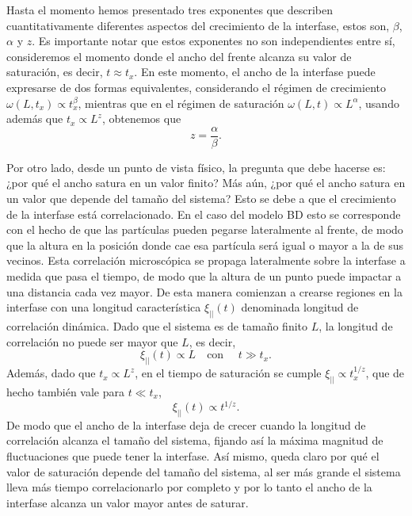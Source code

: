Hasta el momento hemos presentado tres exponentes que describen cuantitativamente diferentes aspectos del crecimiento de la interfase, estos son, 
$\beta$, $\alpha$ y $z$. Es importante notar que estos exponentes no son independientes entre sí, consideremos el momento donde el ancho del frente
alcanza su valor de saturación, es decir, $t \approx t_x$. En este momento, el ancho de la interfase puede expresarse de dos formas equivalentes, 
considerando el régimen de crecimiento $\omega(L,t_x) \propto t_x^\beta$, mientras que en el régimen de saturación $\omega(L,t) \propto L^\alpha$, usando además
que $t_x \propto L^z$, obtenemos que 
\begin{equation}
    z = \frac{\alpha}{\beta}.
\end{equation}

Por otro lado, desde un punto de vista físico, la pregunta que debe hacerse es: ¿por qué el ancho satura en un valor finito? Más aún, ¿por qué el ancho satura en un valor que depende del 
tamaño del sistema? Esto se debe a que el crecimiento de la interfase está correlacionado. En el caso del modelo BD esto se corresponde con el hecho de que 
las partículas pueden pegarse lateralmente al frente, de modo que la altura en la posición donde cae esa partícula será igual o mayor a la de sus vecinos. Esta correlación 
microscópica se propaga lateralmente sobre la interfase a medida que pasa el tiempo, de modo que la altura de un punto puede impactar a una distancia cada vez mayor. De 
esta manera comienzan a crearse regiones en la interfase con una longitud característica $\xi_{||}(t)$ denominada longitud de correlación dinámica. Dado que el sistema es de tamaño 
finito $L$, la longitud de correlación no puede ser mayor que $L$, es decir,
\begin{equation}
    \xi_{||}(t) \propto L \quad \text{con } \quad t \gg t_x.
\end{equation}
Además, dado que $t_x \propto L^z$, en el tiempo de saturación se cumple $\xi_{||} \propto t_x^{1/z}$, que de hecho también vale para $t \ll t_x$,
\begin{equation}
    \xi_{||}(t) \propto t^{1/z}.
\end{equation}
De modo que el ancho de la interfase deja de crecer cuando la longitud de correlación alcanza el tamaño del sistema, fijando así la máxima magnitud de 
fluctuaciones que puede tener la interfase. Así mismo, queda claro por qué el valor de saturación depende del tamaño del sistema, al ser más grande el sistema lleva
más tiempo correlacionarlo por completo y por lo tanto el ancho de la interfase alcanza un valor mayor antes de saturar.

